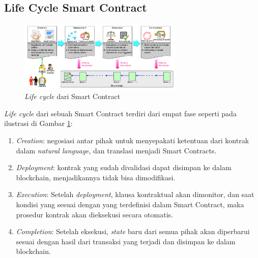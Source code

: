 \subsection{Life Cycle Smart Contract}
\label{subsec:lifecycle}

\begin{figure}[ht]
	\centering
	\includegraphics[width=0.7\textwidth]{resources/chapter-2/sc-lifecycle.png}
	\caption{\textit{Life cycle} dari Smart Contract \parencite{zheng2020overview}}
	\label{image:sc-lifecycle}
\end{figure}

\textit{Life cycle} dari sebuah Smart Contract terdiri dari empat fase seperti pada ilustrasi di Gambar \ref{image:sc-lifecycle}:

\begin{enumerate}
	\item \textit{Creation}: negosiasi antar pihak untuk menyepakati ketentuan dari kontrak dalam \textit{natural language}, dan translasi menjadi Smart Contracts.
	\item \textit{Deployment}: kontrak yang sudah divalidasi dapat disimpan ke dalam blockchain, menjadikannya tidak bisa dimodifikasi.
	\item \textit{Execution}: Setelah \textit{deployment}, klausa kontraktual akan dimonitor, dan saat kondisi yang sesuai dengan yang terdefinisi dalam Smart Contract, maka prosedur kontrak akan dieksekusi secara otomatis.
	\item \textit{Completion}: Setelah eksekusi, \textit{state} baru dari semua pihak akan diperbarui sesuai dengan hasil dari transaksi yang terjadi dan disimpan ke dalam blockchain.
\end{enumerate}